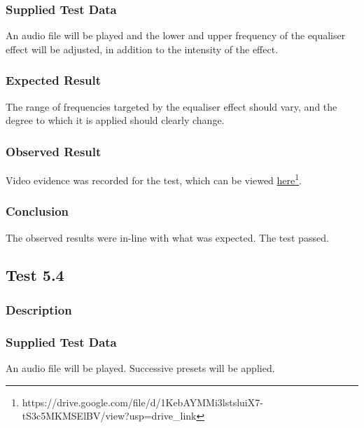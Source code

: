 \subsubsection*{Supplied Test Data}
An audio file will be played and the lower and upper frequency of the equaliser effect will be adjusted, in addition to the intensity of the effect.

\subsubsection*{Expected Result}
The range of frequencies targeted by the equaliser effect should vary, and the degree to which it is applied should clearly change.

\subsubsection*{Observed Result}
\label{sec:evidence5.3}
Video evidence was recorded for the test, which can be viewed \href{https://drive.google.com/file/d/1KebAYMMi3lstsluiX7-tS3c5MKMSElBV/view?usp=drive_link}{here}\footnote{
	https://drive.google.com/file/d/1KebAYMMi3lstsluiX7-tS3c5MKMSElBV/view?usp=drive\_link
}.

\subsubsection*{Conclusion}
The observed results were in-line with what was expected. The test passed.


\pagebreak
\subsection{Test 5.4}
\subsubsection*{Description}
\paragraph{}
{
	\centering
}

\subsubsection*{Supplied Test Data}
An audio file will be played. Successive presets will be applied.


